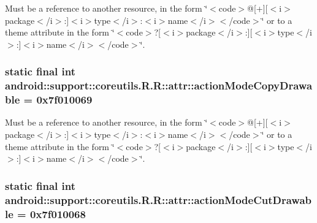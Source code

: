 Must be a reference to another resource, in the form \char`\"{}$<$code$>$@\mbox{[}+\mbox{]}\mbox{[}$<$i$>$package$<$/i$>$:\mbox{]}$<$i$>$type$<$/i$>$:$<$i$>$name$<$/i$>$$<$/code$>$\char`\"{} or to a theme attribute in the form \char`\"{}$<$code$>$?\mbox{[}$<$i$>$package$<$/i$>$:\mbox{]}\mbox{[}$<$i$>$type$<$/i$>$:\mbox{]}$<$i$>$name$<$/i$>$$<$/code$>$\char`\"{}. \hypertarget{classandroid_1_1support_1_1coreutils_1_1_r_1_1attr_321722ce7023bdf467104a1016d40969}{
\subsubsection[{actionModeCopyDrawable}]{\setlength{\rightskip}{0pt plus 5cm}static final int android::support::coreutils.R.R::attr::actionModeCopyDrawable = 0x7f010069}}
\label{classandroid_1_1support_1_1coreutils_1_1_r_1_1attr_321722ce7023bdf467104a1016d40969}


Must be a reference to another resource, in the form \char`\"{}$<$code$>$@\mbox{[}+\mbox{]}\mbox{[}$<$i$>$package$<$/i$>$:\mbox{]}$<$i$>$type$<$/i$>$:$<$i$>$name$<$/i$>$$<$/code$>$\char`\"{} or to a theme attribute in the form \char`\"{}$<$code$>$?\mbox{[}$<$i$>$package$<$/i$>$:\mbox{]}\mbox{[}$<$i$>$type$<$/i$>$:\mbox{]}$<$i$>$name$<$/i$>$$<$/code$>$\char`\"{}. \hypertarget{classandroid_1_1support_1_1coreutils_1_1_r_1_1attr_ca8d0ddca0d7a27c5904c77b4113af09}{
\subsubsection[{actionModeCutDrawable}]{\setlength{\rightskip}{0pt plus 5cm}static final int android::support::coreutils.R.R::attr::actionModeCutDrawable = 0x7f010068}}
\label{classandroid_1_1support_1_1coreutils_1_1_r_1_1attr_ca8d0ddca0d7a27c5904c77b4113af09}


